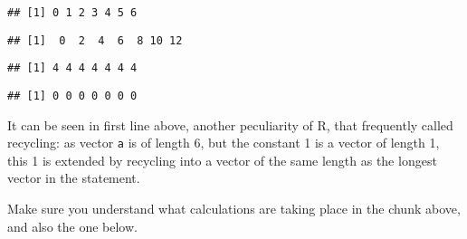 \documentclass[paper=a4,10pt,div=17,headsepline,BCOR=12mm,twoside,open=right]{scrbook}\usepackage{knitr}
\begin{document}
\begin{knitrout}\footnotesize
{}\color{fgcolor}\begin{kframe}
\begin{alltt}
 \hlopt{+}  
\end{alltt}
\begin{verbatim}
## [1] 0 1 2 3 4 5 6
\end{verbatim}
\begin{alltt}
 \hlopt{+} \hlstd{)} \hlopt{*} 
\end{alltt}
\begin{verbatim}
## [1]  0  2  4  6  8 10 12
\end{verbatim}
\begin{alltt}
 \hlopt{+} 
\end{alltt}
\begin{verbatim}
## [1] 4 4 4 4 4 4 4
\end{verbatim}
\begin{alltt}
 \hlopt{-} 
\end{alltt}
\begin{verbatim}
## [1] 0 0 0 0 0 0 0
\end{verbatim}
\end{kframe}
\end{knitrout}

It can be seen in first line above, another peculiarity of R, that frequently called recycling: as vector \texttt{a} is of length 6, but the constant 1 is a vector of length 1, this 1 is extended by recycling into a vector of the same length as the longest vector in the statement.

Make sure you understand what calculations are taking place in the chunk above, and also the one below.
\end{document}
